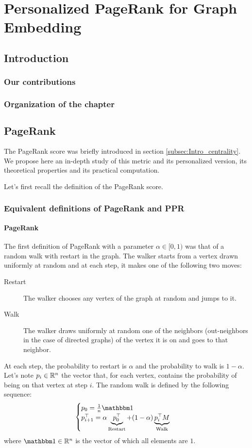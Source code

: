\chapter{Personalized PageRank for Graph Embedding}
\section{Introduction}
\subsection{Our contributions}
\subsection{Organization of the chapter}
\section{PageRank}
The PageRank score was briefly introduced in section \ref{subsec:Intro_centrality}. We propose here an in-depth study of this metric and its personalized version, its theoretical properties and its practical computation.

Let's first recall the definition of the PageRank score.

\subsection{Equivalent definitions of PageRank and PPR} \label{subsec:ppr_definitions}
\subsubsection{PageRank}
The first definition of PageRank with a parameter $\alpha \in [0, 1)$ was that of a random walk with restart in the graph. The walker starts from a vertex drawn uniformly at random and at each step, it makes one of the following two moves:
\begin{description}
    \item[Restart] The walker chooses any vertex of the graph at random and jumps to it.
    \item[Walk] The walker draws uniformly at random one of the neighbors (out-neighbors in the case of directed graphs) of the vertex it is on and goes to that neighbor.
\end{description}

At each step, the probability to restart is $\alpha$ and the probability to walk is $1-\alpha$. Let's note $p_i \in \mathbb{R}^n$ the vector that, for each vertex, contains the probability of being on that vertex at step $i$. The random walk is defined by the following sequence:
\begin{equation}\label{eq:pr_def_as_sequence}
    \begin{cases}
        p_0 = \frac{1}{n}\ones\\
        p_{i+1}^\top = \alpha \underbrace{p_0^\top}_{\text{Restart}} + (1-\alpha)\underbrace{p_i^\top M}_{\text{Walk}}
    \end{cases}
\end{equation}
where $\ones \in \realset^n$ is the vector of which all elements are $1$.

